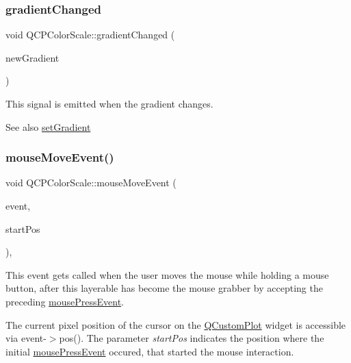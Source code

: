 \subsubsection{\texorpdfstring{gradient\+Changed}{gradientChanged}}
{\footnotesize\ttfamily void Q\+C\+P\+Color\+Scale\+::gradient\+Changed (\begin{DoxyParamCaption}\item[{const \hyperlink{class_q_c_p_color_gradient}{Q\+C\+P\+Color\+Gradient} \&}]{new\+Gradient }\end{DoxyParamCaption})\hspace{0.3cm}{\ttfamily [signal]}}

This signal is emitted when the gradient changes.

\begin{DoxySeeAlso}{See also}
\hyperlink{class_q_c_p_color_scale_a1f29583bb6f1e7f473b62fb712be3940}{set\+Gradient} 
\end{DoxySeeAlso}
\mbox{\label{class_q_c_p_color_scale_a3b2bd79725aefaf2630fc76e90939442}} 
\subsubsection{\texorpdfstring{mouse\+Move\+Event()}{mouseMoveEvent()}}
{\footnotesize\ttfamily void Q\+C\+P\+Color\+Scale\+::mouse\+Move\+Event (\begin{DoxyParamCaption}\item[{Q\+Mouse\+Event $\ast$}]{event,  }\item[{const Q\+PointF \&}]{start\+Pos }\end{DoxyParamCaption})\hspace{0.3cm}{\ttfamily [protected]}, {\ttfamily [virtual]}}

This event gets called when the user moves the mouse while holding a mouse button, after this layerable has become the mouse grabber by accepting the preceding \hyperlink{class_q_c_p_color_scale_a91f633b97ffcd57fdf8cd814974c20e6}{mouse\+Press\+Event}.

The current pixel position of the cursor on the \hyperlink{class_q_custom_plot}{Q\+Custom\+Plot} widget is accessible via {\ttfamily event-\/$>$pos()}. The parameter {\itshape start\+Pos} indicates the position where the initial \hyperlink{class_q_c_p_color_scale_a91f633b97ffcd57fdf8cd814974c20e6}{mouse\+Press\+Event} occured, that started the mouse interaction.

